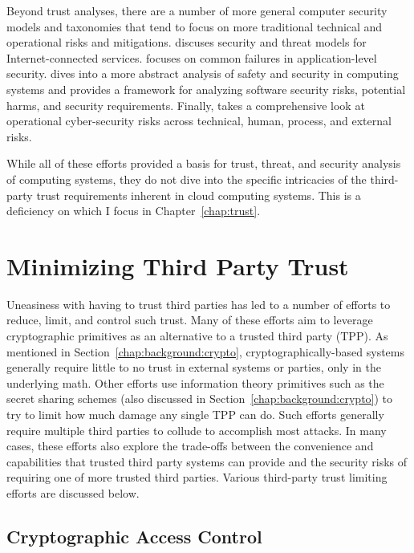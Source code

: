 Beyond trust analyses, there are a number of more general computer
security models and taxonomies that tend to focus on more traditional
technical and operational risks and mitigations. \cite{abbas2005}
discuses security and threat models for Internet-connected
services. \cite{tsipenyuk2005} focuses on common failures in
application-level security. \cite{firesmith2005} dives into a more
abstract analysis of safety and security in computing systems and
provides a framework for analyzing software security risks, potential
harms, and security requirements. Finally, \cite{cebula2010} takes a
comprehensive look at operational cyber-security risks across
technical, human, process, and external risks.

While all of these efforts provided a basis for trust, threat, and
security analysis of computing systems, they do not dive into the
specific intricacies of the third-party trust requirements inherent in
cloud computing systems. This is a deficiency on which I focus in
Chapter~\ref{chap:trust}.

\section{Minimizing Third Party Trust}
\label{chap:related:minimize}

Uneasiness with having to trust third parties has led to a number of
efforts to reduce, limit, and control such trust. Many of these
efforts aim to leverage cryptographic primitives as an alternative to
a trusted third party (TPP). As mentioned in
Section~\ref{chap:background:crypto}, cryptographically-based systems
generally require little to no trust in external systems or parties,
only in the underlying math. Other efforts use information theory
primitives such as the secret sharing schemes (also discussed in
Section~\ref{chap:background:crypto}) to try to limit how much damage
any single TPP can do. Such efforts generally require multiple third
parties to collude to accomplish most attacks. In many cases, these
efforts also explore the trade-offs between the convenience and
capabilities that trusted third party systems can provide and the
security risks of requiring one of more trusted third parties. Various
third-party trust limiting efforts are discussed below.

\subsection{Cryptographic Access Control}

